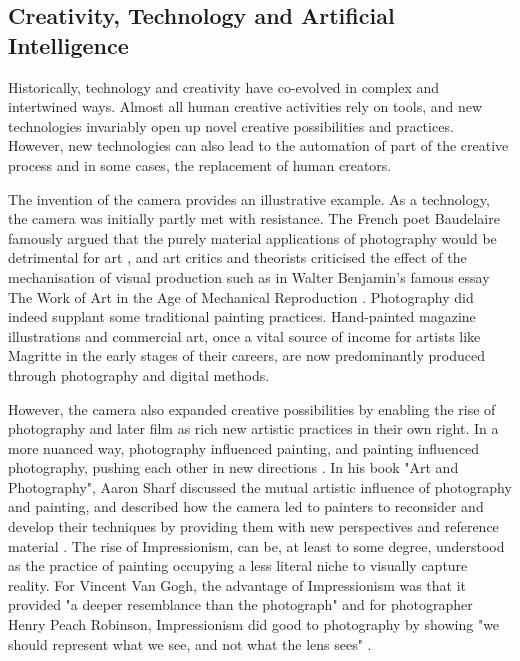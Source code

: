 \subsection{Creativity, Technology and Artificial Intelligence}

Historically, technology and creativity have co-evolved in complex and intertwined ways. Almost all human creative activities rely on tools, and new technologies invariably open up novel creative possibilities and practices. However, new technologies can also lead to the automation of part of the creative process and in some cases, the replacement of human creators.

The invention of the camera provides an illustrative example. As a technology, the camera was initially partly met with resistance. The French poet Baudelaire famously argued that the purely material applications of photography would be detrimental for art \cite{Baudelaire1955-ae}, and art critics and theorists criticised the effect of the mechanisation of visual production such as in Walter Benjamin's famous essay The Work of Art in the Age of Mechanical Reproduction \cite{Benjamin1935-wd} . Photography did indeed supplant some traditional painting practices. Hand-painted magazine illustrations and commercial art, once a vital source of income for artists like Magritte in the early stages of their careers, are now predominantly produced through photography and digital methods. 

However, the camera also expanded creative possibilities by enabling the rise of photography and later film as rich new artistic practices in their own right. In a more nuanced way, photography influenced painting, and painting influenced photography, pushing each other in new directions . In his book "Art and Photography", Aaron Sharf discussed the mutual artistic influence of photography and painting, and described how the camera led to painters to reconsider and develop their techniques by providing them with new perspectives and reference material \cite{Scharf1968-na}. The rise of Impressionism, can be, at least to some degree, understood as the practice of painting occupying a less literal niche to visually capture reality. For Vincent Van Gogh, the advantage of Impressionism was that it provided "a deeper resemblance than the photograph" \citep[p. 116]{Marmor1997-ka} and for photographer Henry Peach Robinson, Impressionism did good to photography by showing "we should represent what we see, and not what the lens sees" \citep[p. 87]{Robinson1896-mo}. 

